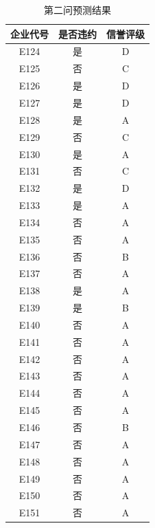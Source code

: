 \documentclass[UTF8]{ctexart}
\begin{document}
\begin{center}
	\begin{longtable}{|c|c|c|}
		\caption{第二问预测结果}
		\label{tab:dasfa}              \\
		\hline
		企业代号 & 是否违约 & 信誉评级 \\ \hline
		E124     & 是       & D        \\ \hline
		E125     & 否       & C        \\ \hline
		E126     & 是       & D        \\ \hline
		E127     & 是       & D        \\ \hline
		E128     & 是       & A        \\ \hline
		E129     & 否       & C        \\ \hline
		E130     & 是       & A        \\ \hline
		E131     & 否       & C        \\ \hline
		E132     & 是       & D        \\ \hline
		E133     & 是       & A        \\ \hline
		E134     & 否       & A        \\ \hline
		E135     & 否       & A        \\ \hline
		E136     & 否       & B        \\ \hline
		E137     & 否       & A        \\ \hline
		E138     & 是       & A        \\ \hline
		E139     & 是       & B        \\ \hline
		E140     & 否       & A        \\ \hline
		E141     & 否       & A        \\ \hline
		E142     & 否       & A        \\ \hline
		E143     & 否       & A        \\ \hline
		E144     & 否       & A        \\ \hline
		E145     & 否       & A        \\ \hline
		E146     & 否       & B        \\ \hline
		E147     & 否       & A        \\ \hline
		E148     & 否       & A        \\ \hline
		E149     & 否       & A        \\ \hline
		E150     & 否       & A        \\ \hline
		E151     & 否       & A        \\ \hline

\end{longtable}
\end{center}
\end{document}
